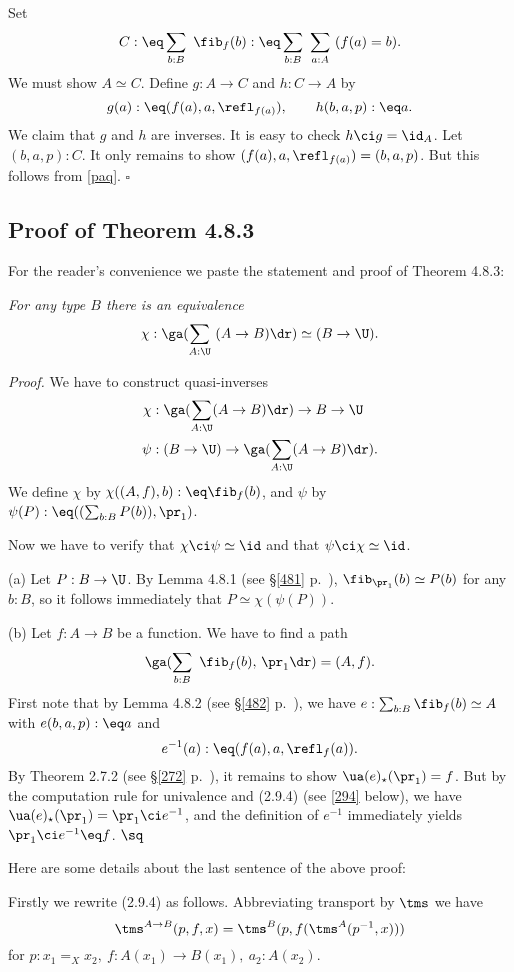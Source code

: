 \documentclass[12pt]{article}
\begin{document}
Set 
$$
C:\eq\sum_{b:B}\ \fib_f(b):\eq\sum_{b:B}\ \sum_{a:A}\ (f(a)=b).
$$ 
We must show $A\simeq C$. Define $g:A\to C$ and $h:C\to A$ by 
$$
g(a):\eq(f(a),a,\refl_{f(a)}),\qquad h(b,a,p):\eq a.
$$ 
We claim that $g$ and $h$ are inverses. It is easy to check $h\ci g=\id_A$. Let $(b,a,p):C$. It only remains to show $(f(a),a,\refl_{f(a)})=(b,a,p)$. But this follows from \eqref{paq}. $\square$


\subsection{Proof of Theorem 4.8.3}

For the reader's convenience we paste the statement and proof of Theorem 4.8.3:

\nn{} \emph{For any type $B$ there is an equivalence}
$$
\chi:\ga(\sum_{A:\U}\ (A\to B)\dr)\simeq(B\to\U).
$$

\nn\emph{Proof.} We have to construct quasi-inverses
\begin{align*}
\chi&:\ga(\sum_{A:\U}(A\to B)\dr)\to B\to\U\\
\psi&:(B\to\U)\to\ga(\sum_{A:\U}(A\to B)\dr).
\end{align*}
We define $\chi$ by $\chi((A,f),b):\eq\fib_f(b)$, and $\psi$ by $\psi(P):\eq((\sum_{b:B} P(b)),\pr_1)$. 

Now we have to verify that $\chi\ci\psi\simeq\id$ and that $\psi\ci\chi\simeq\id$. 

\nn(a) Let $P:B\to\U$. By Lemma 4.8.1 (see \S\ref{481} p.~\pageref{481}), $\fib_{\pr_1}(b)\simeq P(b)$ for any $b:B$, so it follows immediately that $P\simeq\chi(\psi(P))$.

\nn(b) Let $f:A\to B$ be a function. We have to find a path
$$
\ga(\sum_{b:B}\ \fib_f(b),\,\pr_1\dr)=(A,f).
$$ 
First note that by Lemma 4.8.2 (see \S\ref{482} p.~\pageref{482}), we have $e:\sum_{b:B}\fib_f(b)\simeq A$ with $e(b,a,p):\eq a$ and $$e^{-1}(a):\eq(f(a),a,\refl_f(a)).$$ By Theorem 2.7.2 (see \S\ref{272} p.~\pageref{272}), it remains to show $\ua(e)_\star(\pr_1)=f$. But by the computation rule for univalence and (2.9.4) (see \eqref{294} below), we have $\ua(e)_\star(\pr_1)=\pr_1\ci e^{-1}$, and the definition of $e^{-1}$ immediately yields $\pr_1\ci e^{-1}\eq f$. $\sq$

Here are some details about the last sentence of the above proof: 

Firstly we rewrite (2.9.4) as follows. Abbreviating transport by $\tms$ we have 
\begin{equation}\label{294}
\tms^{A\to B}(p,f,x)=\tms^B(p,f(\tms^A(p^{-1},x)))
\end{equation}
for $p:x_1=_Xx_2,\ f:A(x_1)\to B(x_1),\ a_2:A(x_2)$. 
\end{document}
